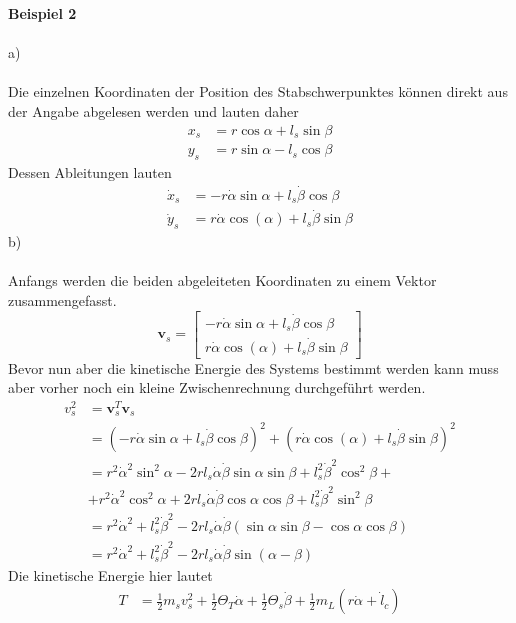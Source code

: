 \textbf{Beispiel 2} \\ \\
a)\\ \\
Die einzelnen Koordinaten der Position des Stabschwerpunktes können direkt aus der Angabe abgelesen werden und lauten daher
\begin{align*}
	x_s &= r\cos\alpha + l_s\sin\beta \\
	y_s &= r\sin\alpha - l_s\cos\beta
\end{align*}
Dessen Ableitungen lauten
\begin{align*}
	\dot{x}_s &= -r\dot{\alpha}\sin\alpha + l_s\dot{\beta}\cos\beta \\
	\dot{y}_s &= r\dot{\alpha}\cos(\alpha) + l_s\dot{\beta}\sin\beta
\end{align*}
b) \\ \\
Anfangs werden die beiden abgeleiteten Koordinaten zu einem Vektor zusammengefasst.
\[
	\textbf{v}_s = \begin{bmatrix}
		-r\dot{\alpha}\sin\alpha + l_s\dot{\beta}\cos\beta \\
		r\dot{\alpha}\cos(\alpha) + l_s\dot{\beta}\sin\beta
	\end{bmatrix}
\]
Bevor nun aber die kinetische Energie des Systems bestimmt werden kann muss aber vorher noch ein kleine Zwischenrechnung durchgeführt werden.
\begin{align*}
	v_s^2 &= \textbf{v}_s^T\textbf{v}_s \\
		  &= (-r\dot{\alpha}\sin\alpha + l_s\dot{\beta}\cos\beta)^2 + (r\dot{\alpha}\cos(\alpha) + l_s\dot{\beta}\sin\beta)^2 \\
		  &= r^2\dot{\alpha}^2\sin^2\alpha - 2rl_s\dot{\alpha}\dot{\beta}\sin\alpha\sin\beta + l_s^2\dot{\beta}^2\cos^2\beta + \\
		  &+ r^2\dot{\alpha}^2\cos^2\alpha + 2rl_s\dot{\alpha}\dot{\beta}\cos\alpha\cos\beta + l_s^2\dot{\beta}^2\sin^2\beta \\
		  &= r^2\dot{\alpha}^2 + l_s^2\dot{\beta}^2 - 2rl_s\dot{\alpha}\dot{\beta}(\sin\alpha\sin\beta - \cos\alpha\cos\beta) \\
		  &= r^2\dot{\alpha}^2 + l_s^2\dot{\beta}^2 - 2rl_s\dot{\alpha}\dot{\beta}\sin(\alpha - \beta)
\end{align*}
Die kinetische Energie hier lautet
\begin{align*}
	T &= \frac{1}{2}m_sv_s^2 + \frac{1}{2}\Theta_T\dot{\alpha} + \frac{1}{2}\Theta_s\dot{\beta} + \frac{1}{2}m_L(r\dot{\alpha} + \dot{l}_c)
\end{align*}
